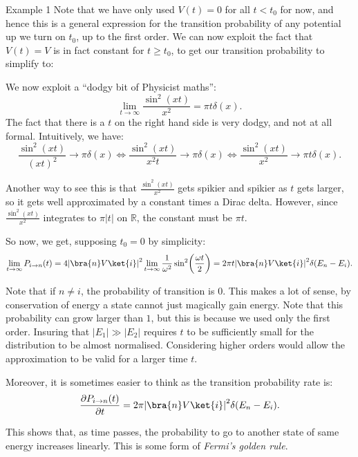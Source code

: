\documentclass[a4paper]{article}
\begin{document}
\begin{parag}{Example 1}
    Note that we have only used $V\left(t\right) = 0$ for all $t < t_0$ for now, and hence this is a general expression for the transition probability of any potential up we turn on $t_0$, up to the first order. We can now exploit the fact that $V\left(t\right) = V$ is in fact constant for $t \geq t_0$, to get our transition probability to simplify to: 
    
    We now exploit a ``dodgy bit of Physicist maths'': 
    \[\lim_{t \to \infty} \frac{\sin^2\left(xt\right)}{x^2} = \pi t \delta\left(x\right).\]
    The fact that there is a $t$ on the right hand side is very dodgy, and not at all formal. Intuitively, we have: 
    \[\frac{\sin^2\left(xt\right)}{\left(xt\right)^2} \to \pi \delta\left(x\right) \iff \frac{\sin^2\left(xt\right)}{x^2 t} \to \pi \delta\left(x\right) \iff \frac{\sin^2\left(xt\right)}{x^2} \to \pi t \delta\left(x\right).\]

    Another way to see this is that $\frac{\sin^2\left(xt\right)}{x^2}$ gets spikier and spikier as $t$ gets larger, so it gets well approximated by a constant times a Dirac delta. However, since $\frac{\sin^2\left(xt\right)}{x^2}$ integrates to $\pi \left|t\right|$ on $\mathbb{R}$, the constant must be $\pi t$.

    So now, we get, supposing $t_0 = 0$ by simplicity: 
    \[\lim_{t \to \infty} P_{i \to n}\left(t\right) = 4 \left|\bra{n} V \ket{i}\right|^2 \lim_{t \to \infty} \frac{1}{\omega^2} \sin^2\left(\frac{\omega t}{2}\right) = 2 \pi t \left|\bra{n} V \ket{i}\right|^2 \delta\left(E_n - E_i\right).\]

    Note that if $n \neq i$, the probability of transition is $0$. This makes a lot of sense, by conservation of energy a state cannot just magically gain energy. Note that this probability can grow larger than $1$, but this is because we used only the first order. Insuring that $\left|E_1\right| \gg \left|E_2\right|$ requires $t$ to be sufficiently small for the distribution to be almost normalised. Considering higher orders would allow the approximation to be valid for a larger time $t$.

    Moreover, it is sometimes easier to think as the transition probability rate is: 
    \[\frac{\partial P_{i \to n}\left(t\right)}{\partial t} = 2 \pi \left|\bra{n} V \ket{i}\right|^2 \delta\left(E_n - E_i\right).\]

    This shows that, as time passes, the probability to go to another state of same energy increases linearly. This is some form of \textit{Fermi's golden rule}.
\end{parag}
\end{document}
